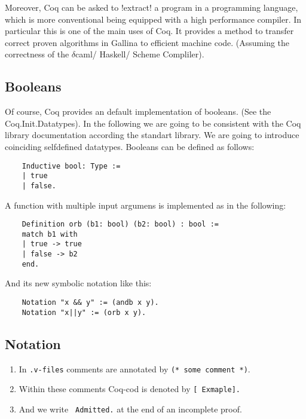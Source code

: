     Moreover, Coq can be asked to \lstlisting!extract! a program in a programming language, which is more conventional being equipped with a high performance compiler.
    In particular this is one of the main uses of Coq. 
    It provides a method to transfer correct proven algorithms in Gallina to efficient machine code.
    (Assuming the correctness of the $\delta$caml/ Haskell/ Scheme Compliler). %
    
    \subsection{Booleans}
    Of course, Coq provides an default implementation of booleans. (See the Coq.Init.Datatypes). %
    In the following we are going to be consistent with the Coq library documentation according the standart library. We are going to introduce coinciding selfdefined datatypes.
    Booleans can be defined as follows:
    
    \label{Def:booleans}
    \begin{lstlisting}    
    Inductive bool: Type :=
    | true
    | false.
    \end{lstlisting}
    
    A function with multiple input argumens is implemented as in the following:
    \begin{lstlisting}
    Definition orb (b1: bool) (b2: bool) : bool :=
    match b1 with
    | true -> true
    | false -> b2
    end.
    \end{lstlisting}
     
    And its new symbolic notation like this:
    \begin{lstlisting}
    Notation "x && y" := (andb x y).
    Notation "x||y" := (orb x y).
    \end{lstlisting}
     
     \subsection{Notation}
    \begin{enumerate}
     \item In \texttt{.v-files} comments are annotated by \lstinline!(* some comment *)!. 
     \item Within these comments Coq-cod is denoted by \lstinline![ Exmaple].! 
     \item And we write \lstinline! Admitted.! at the end of an incomplete proof.    
     \end{enumerate}
     

